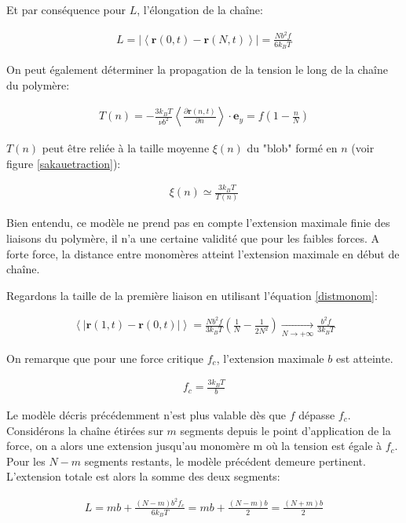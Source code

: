 Et par conséquence pour $L$, l'élongation de la chaîne: 

\begin{eqnarray}
L=|\left<\mathbf{r}(0,t)-\mathbf{r}(N,t)\right> | = \frac{Nb^2f}{6k_BT} 
\end{eqnarray}

On peut également déterminer la propagation de la tension le long de la chaîne du polymère:

\begin{eqnarray}
T(n) = -\frac{3k_BT}{\nu b^2}\left<\frac{\partial  \textbf{r}(n,t)}{\partial  n}\right> \cdot \textbf{e}_{y} = f \left(1-\frac{n}{N}\right)
\end{eqnarray}

$T(n)$ peut être reliée à la taille moyenne $\xi(n)$ du "blob" \cite{Pincus1976} formé en $n$ (voir figure \ref{sakauetraction}):

\begin{eqnarray}
\xi(n) \simeq \frac{3k_BT}{T(n)}
\end{eqnarray}


Bien entendu, ce modèle ne prend pas en compte l'extension maximale finie des liaisons du polymère, il n'a une certaine validité que pour les faibles forces. A forte force, la distance entre monomères atteint l'extension maximale en début de chaîne.

Regardons la taille de la première liaison en utilisant l'équation \ref{distmonom}:

\begin{eqnarray}
\left<|\mathbf{r}(1,t)-\mathbf{r}(0,t)|\right> = \frac{Nb^2f}{3k_BT} \left(\frac{1}{N}-\frac{1}{2N^2} \right) \underset{N\to+\infty}{\longrightarrow} \frac{b^2f}{3k_BT}
\end{eqnarray} 

On remarque que pour une force critique $f_c$, l'extension maximale $b$ est atteinte.

\begin{eqnarray}
f_c=\frac{3k_BT}{b} 
\end{eqnarray} 

Le modèle décris précédemment n'est plus valable dès que $f$ dépasse $f_c$. Considérons la chaîne étirées sur $m$ segments depuis le point d'application de la force, on a alors une extension jusqu'au monomère m où la tension est égale à $f_c$. Pour les $N-m$ segments restants, le modèle précédent demeure pertinent.
L'extension totale est alors la somme des deux segments:

\begin{eqnarray}
L=  m b + \frac{(N-m)b^2f_c}{6k_BT} = mb + \frac{(N-m)b}{2} = \frac{(N+m)b}{2}
\end{eqnarray}

